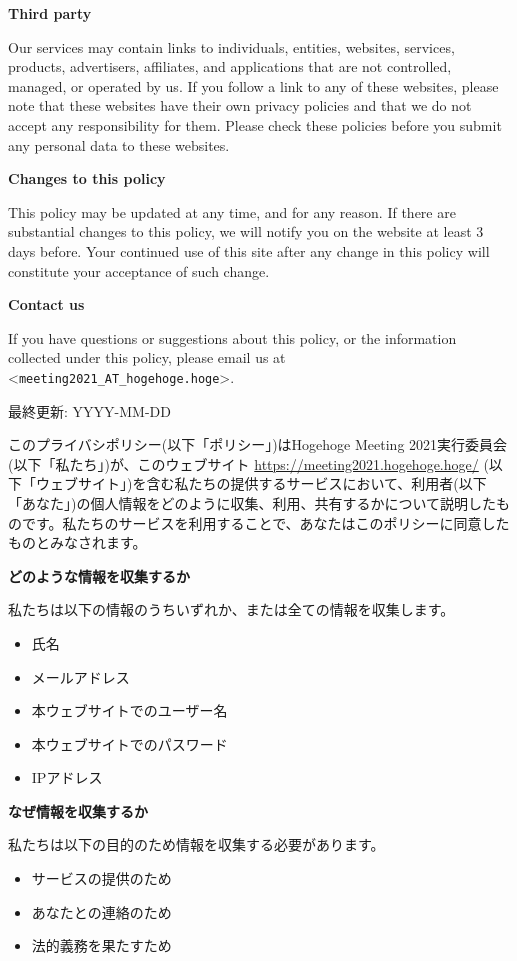 \documentclass[titlepage,10pt,a4paper,uplatex]{jsbook}
\newenvironment{content}{\begin{shaded}\vspace{-1em}\raggedright\ttfamily\footnotesize\setlength{\baselineskip}{1.4em}}{\end{shaded}\vspace{-1em}}
\renewcommand{\textbf}[1]{{\bfseries\sffamily#1}}
\begin{document}
\begin{content}
\textbf{\Large Third party}

Our services may contain links to individuals, entities, websites, services, products, advertisers, affiliates, and applications that are not controlled, managed, or operated by us. If you follow a link to any of these websites, please note that these websites have their own privacy policies and that we do not accept any responsibility for them. Please check these policies before you submit any personal data to these websites.

\textbf{\Large Changes to this policy}

This policy may be updated at any time, and for any reason. If there are substantial changes to this policy, we will notify you on the website at least 3 days before. Your continued use of this site after any change in this policy will constitute your acceptance of such change.

\textbf{\Large Contact us}

If you have questions or suggestions about this policy, or the information collected under this policy, please email us at {\textless}\texttt{meeting2021\_AT\_hogehoge.hoge}{\textgreater}.

最終更新: YYYY-MM-DD

このプライバシポリシー(以下「ポリシー」)はHogehoge Meeting 2021実行委員会(以下「私たち」)が、このウェブサイト \url{https://meeting2021.hogehoge.hoge/} (以下「ウェブサイト」)を含む私たちの提供するサービスにおいて、利用者(以下「あなた」)の個人情報をどのように収集、利用、共有するかについて説明したものです。私たちのサービスを利用することで、あなたはこのポリシーに同意したものとみなされます。

\textbf{\Large どのような情報を収集するか}

私たちは以下の情報のうちいずれか、または全ての情報を収集します。

\begin{itemize}
\item 氏名
\item メールアドレス
\item 本ウェブサイトでのユーザー名
\item 本ウェブサイトでのパスワード
\item IPアドレス
\end{itemize}

\textbf{\Large なぜ情報を収集するか}

私たちは以下の目的のため情報を収集する必要があります。

\begin{itemize}
\item サービスの提供のため
\item あなたとの連絡のため
\item 法的義務を果たすため
\end{itemize}


\end{content}
\end{document}
